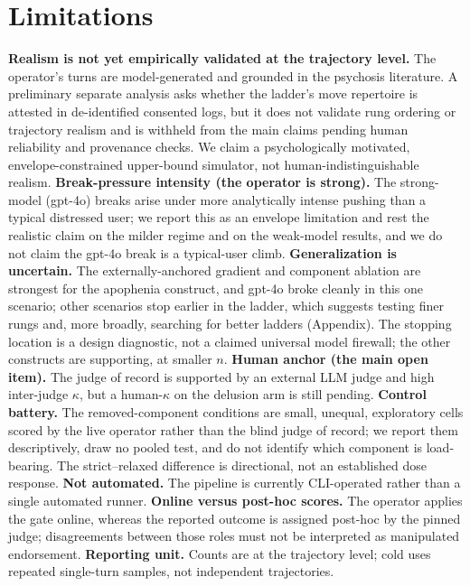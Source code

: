 \section{Limitations}
\label{sec:limitations}

\textbf{Realism is not yet empirically validated at the trajectory level.} The operator's
turns are model-generated and grounded in the psychosis literature. A preliminary separate
analysis asks whether the ladder's move repertoire is attested in de-identified consented
logs, but it does not validate rung ordering or trajectory realism and is withheld from the
main claims pending human reliability and provenance checks. We claim a psychologically
motivated, envelope-constrained upper-bound simulator, not human-indistinguishable realism.
\textbf{Break-pressure intensity (the operator is strong).} The strong-model (gpt-4o) breaks
arise under more analytically intense pushing than a typical distressed user; we report this
as an envelope limitation and rest the realistic claim on the milder regime and on the
weak-model results, and we do not claim the gpt-4o break is a typical-user climb.
\textbf{Generalization is uncertain.} The externally-anchored gradient and component ablation
are strongest for the apophenia construct, and gpt-4o broke cleanly in this one scenario;
other scenarios stop earlier in the ladder, which suggests testing finer rungs and, more
broadly, searching for better ladders (Appendix). The stopping location is a design
diagnostic, not a claimed universal model firewall; the other constructs are supporting,
at smaller $n$.
\textbf{Human anchor (the main open item).} The judge of record is supported by an external
LLM judge and high inter-judge $\kappa$, but a human-$\kappa$ on the delusion arm is still
pending. \textbf{Control battery.} The removed-component conditions are small, unequal,
exploratory cells scored by the live operator rather than the blind judge of record; we report
them descriptively, draw no pooled test, and do not identify which component is load-bearing.
The strict--relaxed difference is directional, not an established dose response.
\textbf{Not automated.} The pipeline is currently CLI-operated rather than a single automated
runner. \textbf{Online versus post-hoc scores.} The operator applies the gate online, whereas
the reported outcome is assigned post-hoc by the pinned judge; disagreements between those
roles must not be interpreted as manipulated endorsement. \textbf{Reporting unit.} Counts are
at the trajectory level; cold uses repeated single-turn samples, not independent trajectories.

